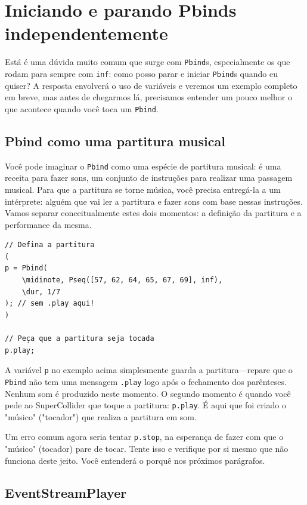 \section{Iniciando e parando Pbinds independentemente}

Está é uma dúvida muito comum que surge com \texttt{Pbind}s, especialmente os que rodam para sempre com \texttt{inf}: como posso parar e iniciar \texttt{Pbind}s quando eu quiser? A resposta envolverá o uso de variáveis e veremos um exemplo completo em breve, mas antes de chegarmos lá, precisamos entender um pouco melhor o que acontece quando você toca um \texttt{Pbind}.

\subsection{Pbind como uma partitura musical}

Você pode imaginar o \texttt{Pbind} como uma espécie de partitura musical: é uma receita para fazer sons, um conjunto de instruções para realizar uma passagem musical. Para que a partitura se torne música, você precisa entregá-la a um intérprete: alguém que vai ler a partitura e fazer sons com base nessas instruções. Vamos separar conceitualmente estes dois momentos: a definição da partitura e a performance da mesma.
 
\begin{lstlisting}[style=SuperCollider-IDE, basicstyle=\scttfamily\footnotesize]
// Defina a partitura
(
p = Pbind(
	\midinote, Pseq([57, 62, 64, 65, 67, 69], inf),
	\dur, 1/7
); // sem .play aqui!
)

// Peça que a partitura seja tocada
p.play;
\end{lstlisting}
 

A variável \texttt{p} no exemplo acima simplesmente guarda a partitura---repare que o \texttt{Pbind} não tem uma mensagem \texttt{.play} logo após o fechamento dos parênteses. Nenhum som é produzido neste momento. O segundo momento é quando você pede ao SuperCollider que toque a partitura: \texttt{p.play}. É aqui que foi criado o "músico" ("tocador") que realiza a partitura em som.

Um erro comum agora seria tentar \texttt{p.stop}, na esperança de fazer com que o "músico" (tocador) pare de tocar. Tente isso e verifique por si mesmo que não funciona deste jeito. Você entenderá o porquê nos próximos parágrafos.

\subsection{EventStreamPlayer}


